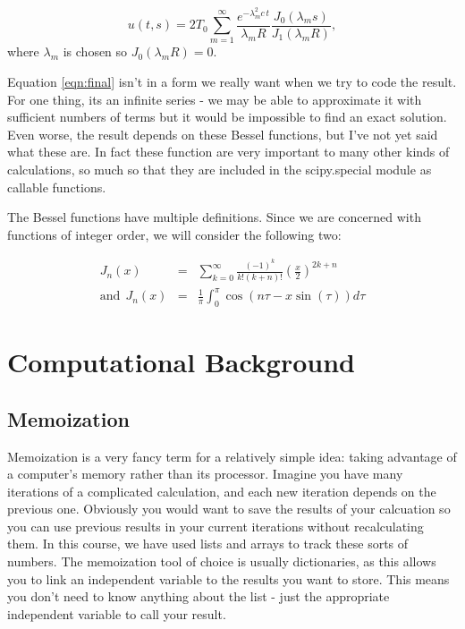 \documentclass[a4paper,12pt]{article}
\begin{document}
\begin{equation}
u(t,s) = 2 T_0\sum_{m = 1}^{\infty}\frac{e^{-\lambda_m^2 c\,t}}{\lambda_m R}\frac{J_0(\lambda_m s)}{J_1(\lambda_m R)},
\label{eqn:final}
\end{equation}
%
where $\lambda_m$ is chosen so $J_0(\lambda_m R) = 0$.

Equation \ref{eqn:final} isn't in a form we really want when we try to code the result. For one thing, its an infinite series - we may be able to approximate it with sufficient numbers of terms but it would be impossible to find an exact solution. Even worse, the result depends on these Bessel functions, but I've not yet said what these are. In fact these function are very important to many other kinds of calculations, so much so that they are included in the scipy.special module as callable functions.

The Bessel functions have multiple definitions. Since we are concerned with functions of integer order, we will consider the following two:

\begin{eqnarray}
J_n(x) &=& \sum_{k=0}^{\infty}\frac{(-1)^k}{k!(k+n)!}\left(\frac{x}{2}\right)^{2k+n}\label{eqn:bessum}\\
\mathrm{and}\:\: J_n(x) &=& \frac{1}{\pi}\int_{0}^{\pi}\cos(n\tau - x\sin(\tau))d\tau
\label{eqn:besint}
\end{eqnarray}

\section{Computational Background}

\subsection*{Memoization}

Memoization is a very fancy term for a relatively simple idea: taking advantage of a computer's memory rather than its processor. Imagine you have many iterations of a complicated calculation, and each new iteration depends on the previous one. Obviously you would want to save the results of your calcuation so you can use previous results in your current iterations without recalculating them. In this course, we have used lists and arrays to track these sorts of numbers. The memoization tool of choice is usually dictionaries, as this allows you to link an independent variable to the results you want to store. This means you don't need to know anything about the list - just the appropriate independent variable to call your result.
\end{document}
